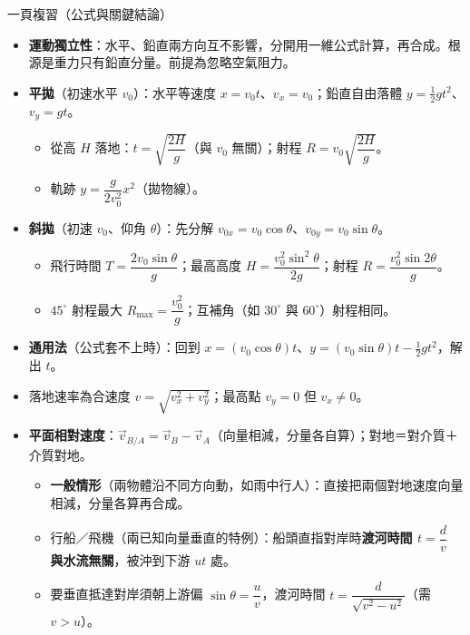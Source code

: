 \documentclass[11pt]{article}
\begin{document}
\begin{補充框}{一頁複習（公式與關鍵結論）}
\begin{itemize}\setlength{\itemsep}{2pt}
\item \textbf{運動獨立性}：水平、鉛直兩方向互不影響，分開用一維公式計算，再合成。根源是重力只有鉛直分量。前提為忽略空氣阻力。
\item \textbf{平拋}（初速水平 $v_0$）：水平等速度 $x=v_0 t$、$v_x=v_0$；鉛直自由落體 $y=\tfrac12 g t^2$、$v_y=gt$。
  \begin{itemize}\setlength{\itemsep}{1pt}
  \item 從高 $H$ 落地：$t=\sqrt{\dfrac{2H}{g}}$（與 $v_0$ 無關）；射程 $R=v_0\sqrt{\dfrac{2H}{g}}$。
  \item 軌跡 $y=\dfrac{g}{2v_0^2}x^2$（拋物線）。
  \end{itemize}
\item \textbf{斜拋}（初速 $v_0$、仰角 $\theta$）：先分解 $v_{0x}=v_0\cos\theta$、$v_{0y}=v_0\sin\theta$。
  \begin{itemize}\setlength{\itemsep}{1pt}
  \item 飛行時間 $T=\dfrac{2v_0\sin\theta}{g}$；最高高度 $H=\dfrac{v_0^2\sin^2\theta}{2g}$；射程 $R=\dfrac{v_0^2\sin 2\theta}{g}$。
  \item $45^\circ$ 射程最大 $R_{\max}=\dfrac{v_0^2}{g}$；互補角（如 $30^\circ$ 與 $60^\circ$）射程相同。
  \end{itemize}
\item \textbf{通用法}（公式套不上時）：回到 $x=(v_0\cos\theta)t$、$y=(v_0\sin\theta)t-\tfrac12 gt^2$，解出 $t$。
\item 落地速率為合速度 $v=\sqrt{v_x^2+v_y^2}$；最高點 $v_y=0$ 但 $v_x\ne0$。
\item \textbf{平面相對速度}：$\vec v_{B/A}=\vec v_B-\vec v_A$（向量相減，分量各自算）；對地＝對介質＋介質對地。
  \begin{itemize}\setlength{\itemsep}{1pt}
  \item \textbf{一般情形}（兩物體沿不同方向動，如雨中行人）：直接把兩個對地速度向量相減，分量各算再合成。
  \item 行船／飛機（兩已知向量垂直的特例）：船頭直指對岸時\textbf{渡河時間 $t=\dfrac{d}{v}$ 與水流無關}，被沖到下游 $ut$ 處。
  \item 要垂直抵達對岸須朝上游偏 $\sin\theta=\dfrac{u}{v}$，渡河時間 $t=\dfrac{d}{\sqrt{v^2-u^2}}$（需 $v>u$）。
  \end{itemize}
\end{itemize}
\end{補充框}
\end{document}
